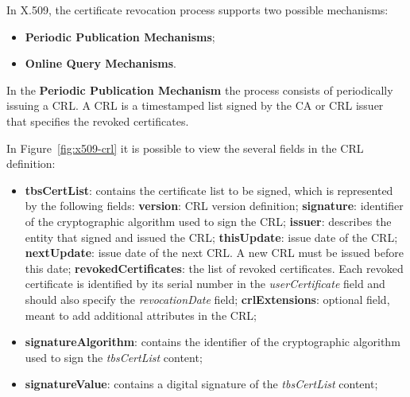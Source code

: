In X.509, the certificate revocation process supports two possible mechanisms:

\begin{itemize}
	\item \textbf{Periodic Publication Mechanisms};
	\item \textbf{Online Query Mechanisms}.
\end{itemize}

In the \textbf{Periodic Publication Mechanism} the process consists of periodically issuing a \acl{CRL}. A \ac{CRL} is a timestamped list signed by the \ac{CA} or \ac{CRL} issuer that specifies the revoked certificates.

In Figure~\ref{fig:x509-crl} it is possible to view the several fields in the \ac{CRL} definition:

\begin{itemize}
	\item \textbf{tbsCertList}: contains the certificate list to be signed, which is represented by the following fields:
		\subitem \textbf{version}: \ac{CRL} version definition;
		\subitem \textbf{signature}: identifier of the cryptographic algorithm used to sign the \ac{CRL};
		\subitem \textbf{issuer}: describes the entity that signed and issued the CRL;
		\subitem \textbf{thisUpdate}: issue date of the \ac{CRL};
		\subitem \textbf{nextUpdate}: issue date of the next \ac{CRL}. A new \ac{CRL} must be issued before this date;
		\subitem \textbf{revokedCertificates}: the list of revoked certificates. Each revoked certificate is identified by its serial number in the \textit{userCertificate} field and should also specify the \textit{revocationDate} field;
		\subitem \textbf{crlExtensions}: optional field, meant to add additional attributes in the \ac{CRL};
	\item \textbf{signatureAlgorithm}: contains the identifier of the cryptographic algorithm used to sign the \textit{tbsCertList} content;
	\item \textbf{signatureValue}: contains a digital signature of the \textit{tbsCertList} content;
\end{itemize}

